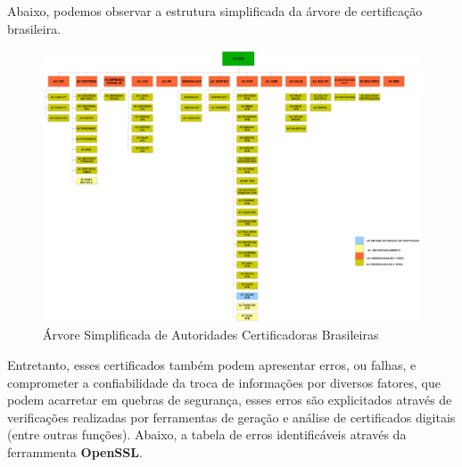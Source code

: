 	Abaixo, podemos observar a estrutura simplificada da árvore de certificação brasileira.

	\begin{figure}[!ht]
		\centering
		\label{img08}
		\caption{Árvore Simplificada de Autoridades Certificadoras Brasileiras \cite{itiICPBRASIL}}
		\includegraphics[keepaspectratio=true,scale=0.7]{figuras/certBR.eps}
	\end{figure}

	Entretanto, esses certificados também podem apresentar erros, ou falhas, e comprometer a confiabilidade da troca de informações por diversos fatores, que podem acarretar em quebras de segurança, esses erros são explicitados através de verificações realizadas por ferramentas de geração e análise de certificados digitais (entre outras funções). Abaixo, a tabela de erros identificáveis através da ferrammenta \textbf{OpenSSL}. 

